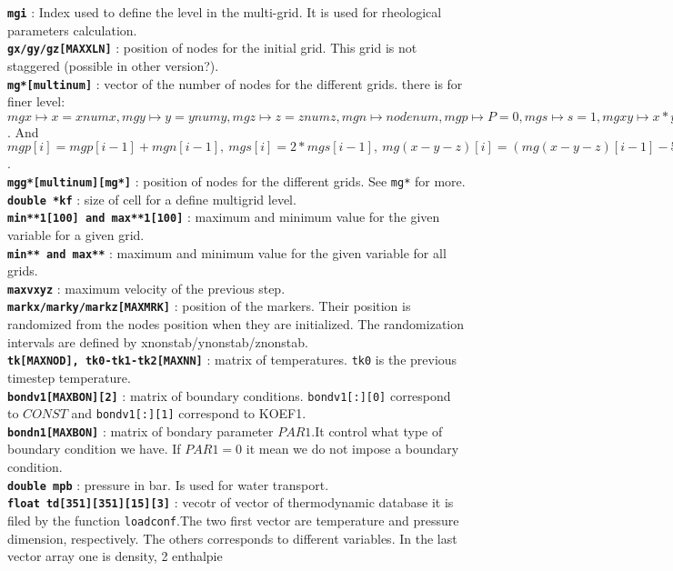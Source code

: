 \textbf{\texttt{mgi}} : Index used to define the level in the multi-grid. It is used for rheological parameters calculation.
\\
\textbf{\texttt{gx/gy/gz[MAXXLN]}} : position of nodes for the initial grid. This grid is not staggered (possible in other version?).
\\
\textbf{\texttt{mg*[multinum]}} : vector of the number of nodes for the different grids. there is for finer level: $mgx\longmapsto x=xnumx, mgy\longmapsto y=ynumy, mgz\longmapsto z=znumz, mgn\longmapsto nodenum, mgp\longmapsto P=0, mgs\longmapsto s=1, mgxy\longmapsto x*y=xnumx*ynumy $.
And $mgp[i]=mgp[i-1]+mgn[i-1],\  mgs[i]=2*mgs[i-1],\  mg(x-y-z)[i]=( mg(x-y-z)[i-1] -5)/2+5,\  mgn[i]= \Sigma mg(x-y-z)[i]$.
\\
\textbf{\texttt{mgg*[multinum][mg*]}} : position of nodes for the different grids. See \texttt{mg*} for more.
\\
\textbf{\texttt{double *kf}} : size of cell for a define multigrid level.
\\
\textbf{\texttt{min**1[100] and max**1[100]}} : maximum and minimum value for the given variable for a given grid.
\\
\textbf{\texttt{min** and max**}} : maximum and minimum value for the given variable for all grids.
\\
\textbf{\texttt{maxvxyz}} : maximum velocity of the previous step.
\\
\textbf{\texttt{markx/marky/markz[MAXMRK]}} : position of the markers. Their position is randomized from the nodes position when they are initialized. The randomization intervals are defined by xnonstab/ynonstab/znonstab.
\\
\textbf{\texttt{tk[MAXNOD], tk0-tk1-tk2[MAXNN]}} : matrix of temperatures. \texttt{tk0} is the previous timestep temperature.
\\
\textbf{\texttt{bondv1[MAXBON][2]}} : matrix of boundary conditions. \texttt{bondv1[:][0]} correspond to $CONST$ and \texttt{bondv1[:][1]} correspond to KOEF1.
\\
\textbf{\texttt{bondn1[MAXBON]}} : matrix of bondary parameter $PAR1$.It control what type of boundary condition we have. If $PAR1=0$ it mean we do not impose a boundary condition.
\\
\textbf{\texttt{double mpb}} : pressure in bar. Is used for water transport.
\\
\textbf{\texttt{float td[351][351][15][3]}} : vecotr of vector of thermodynamic database it is filed by the function \texttt{loadconf}.The two first vector are temperature and pressure dimension, respectively. The others corresponds to different variables. In the last vector array one is density, 2 enthalpie
